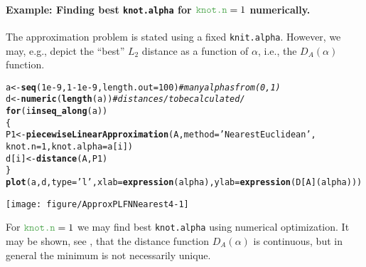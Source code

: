 \documentclass[11pt]{article}\usepackage[]{graphicx}\usepackage[]{color}
\makeatletter
\newcommand{\hlnum}[1]{\textcolor[rgb]{0.686,0.059,0.569}{#1}}%
\newcommand{\hlstr}[1]{\textcolor[rgb]{0.192,0.494,0.8}{#1}}%
\newcommand{\hlcom}[1]{\textcolor[rgb]{0.678,0.584,0.686}{\textit{#1}}}%
\newcommand{\hlopt}[1]{\textcolor[rgb]{0,0,0}{#1}}%
\newcommand{\hlstd}[1]{\textcolor[rgb]{0.345,0.345,0.345}{#1}}%
\newcommand{\hlkwa}[1]{\textcolor[rgb]{0.161,0.373,0.58}{\textbf{#1}}}%
\newcommand{\hlkwb}[1]{\textcolor[rgb]{0.69,0.353,0.396}{#1}}%
\newcommand{\hlkwc}[1]{\textcolor[rgb]{0.333,0.667,0.333}{#1}}%
\newcommand{\hlkwd}[1]{\textcolor[rgb]{0.737,0.353,0.396}{\textbf{#1}}}%
\newenvironment{kframe}{%
 \def\at@end@of@kframe{}%
 \ifinner\ifhmode%
  \def\at@end@of@kframe{\end{minipage}}%
  \begin{minipage}{\columnwidth}%
 \fi\fi%
 \def\FrameCommand##1{\hskip\@totalleftmargin \hskip-\fboxsep
 \colorbox{shadecolor}{##1}\hskip-\fboxsep
     \hskip-\linewidth \hskip-\@totalleftmargin \hskip\columnwidth}%
 \MakeFramed {\advance\hsize-\width
   \@totalleftmargin\z@ \linewidth\hsize
   \@setminipage}}%
 {\par\unskip\endMakeFramed%
 \at@end@of@kframe}
\newenvironment{knitrout}{}{} %
\newcommand{\argument}[1]{\texttt{\hlkwc{#1}}}
\makeatother
\begin{document}
\paragraph{Example: Finding best \argument{knot.alpha}
for $\text{\argument{knot.n}}=1$ numerically.}
The approximation problem is stated using a fixed
\argument{knit.alpha}.
However, we may, e.g., depict the ``best'' $L_2$ distance as a function of $\alpha$,
i.e., the $D_{A}(\alpha)$ function.

\begin{knitrout}\small
{}\color{fgcolor}\begin{kframe}
\begin{alltt}
\hlstd{a} \hlkwb{<-} \hlkwd{seq}\hlstd{(}\hlnum{1e-9}\hlstd{,} \hlnum{1}\hlopt{-}\hlnum{1e-9}\hlstd{,} \hlkwc{length.out}\hlstd{=}\hlnum{100}\hlstd{)} \hlcom{# many alphas from (0,1)}
\hlstd{d} \hlkwb{<-} \hlkwd{numeric}\hlstd{(}\hlkwd{length}\hlstd{(a))} \hlcom{# distances /to be calculated/}
\hlkwa{for} \hlstd{(i} \hlkwa{in} \hlkwd{seq_along}\hlstd{(a))}
\hlstd{\{}
   \hlstd{P1} \hlkwb{<-} \hlkwd{piecewiseLinearApproximation}\hlstd{(A,} \hlkwc{method}\hlstd{=}\hlstr{'NearestEuclidean'}\hlstd{,}
            \hlkwc{knot.n}\hlstd{=}\hlnum{1}\hlstd{,} \hlkwc{knot.alpha}\hlstd{=a[i])}
   \hlstd{d[i]} \hlkwb{<-} \hlkwd{distance}\hlstd{(A, P1)}
\hlstd{\}}
\hlkwd{plot}\hlstd{(a, d,} \hlkwc{type}\hlstd{=}\hlstr{'l'}\hlstd{,} \hlkwc{xlab}\hlstd{=}\hlkwd{expression}\hlstd{(alpha),} \hlkwc{ylab}\hlstd{=}\hlkwd{expression}\hlstd{(D[A](alpha)))}
\end{alltt}
\end{kframe}
\end{knitrout}

\begin{center}
\begin{knitrout}\small
{}\color{fgcolor}

{\centering \texttt{[image: figure/ApproxPLFNNearest4-1]} 

}



\end{knitrout}
\end{center}

For $\text{\argument{knot.n}}=1$ we may find best \argument{knot.alpha} using numerical optimization.
It may be shown, see \cite{CoroianuETAL2013:piecewise1},
that the distance function $D_{A}(\alpha)$ is continuous,
but in general the minimum is not necessarily unique.
\end{document}
